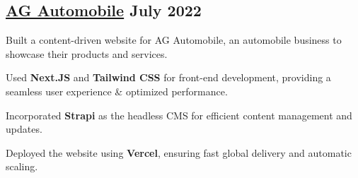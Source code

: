 \subsection{{\href{https://www.agautomobile.com/}{AG Automobile} \hfill July 2022}}
\begin{zitemize}
\item Built a content-driven website for AG Automobile, an automobile business to showcase their products and services.
\item Used \textbf{Next.JS} and \textbf{Tailwind CSS} for front-end development, providing a seamless user experience \& optimized performance.
\item Incorporated \textbf{Strapi} as the headless CMS for efficient content management and updates.
\item Deployed the website using \textbf{Vercel}, ensuring fast global delivery and automatic scaling.
\end{zitemize}



